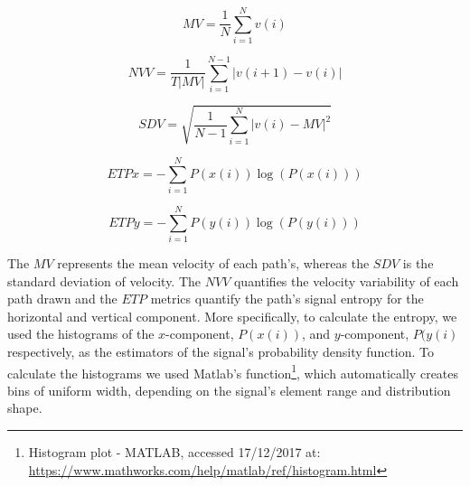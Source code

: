 
\begin{equation} \label{eq: MV}
MV = \frac{1}{N}\sum_{i=1}^{N}v(i)
\end{equation}

\begin{equation} \label{eq: NVV}
NVV = \frac{1}{T|MV|}\sum_{i=1}^{N-1}|v(i+1) - v(i)|
\end{equation}

\begin{equation} \label{eq: SDV}
SDV = \sqrt{\frac{1}{N-1}\sum_{i=1}^{N}|v(i)-MV|^{2}}
\end{equation}

\begin{equation} \label{eq: ETPx}
ETPx = -\sum_{i=1}^{N}P(x(i))\log(P(x(i)))
\end{equation}

\begin{equation} \label{eq: ETPy}
ETPy = -\sum_{i=1}^{N}P(y(i))\log(P(y(i)))
\end{equation}

\noindent
The $MV$ represents the mean velocity of each path's, whereas the $SDV$ is the standard deviation of velocity. The $NVV$ quantifies the velocity variability of each path drawn and the $ETP$ metrics quantify the path's signal entropy for the horizontal and vertical component. More specifically, to calculate the entropy, we used the histograms of the $x$-component, $P(x(i))$, and $y$-component, $P(y(i)$ respectively, as the estimators of the signal's probability density function. To calculate the histograms we used Matlab's  function\footnote{Histogram plot - MATLAB, accessed 17/12/2017 at: \url{https://www.mathworks.com/help/matlab/ref/histogram.html}}, which automatically creates bins of uniform width, depending on the signal's element range and distribution shape. 

